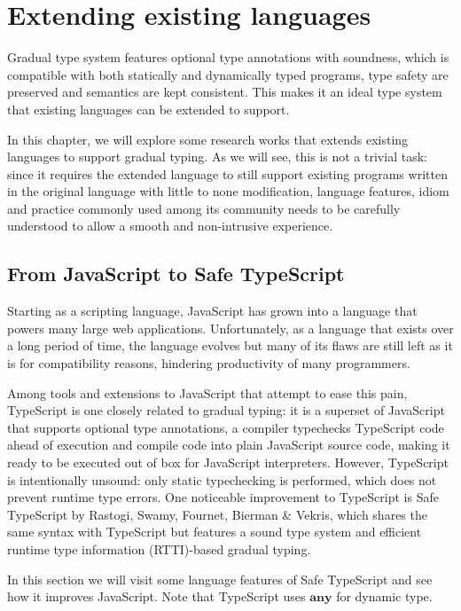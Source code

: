 
\renewcommand{\thechapter}{2}

\chapter{Extending existing languages}

Gradual type system features optional type annotations with soundness,
which is compatible with both statically and dynamically typed programs,
type safety are preserved and semantics are kept consistent.
This makes it an ideal type system that
existing languages can be extended to support.

In this chapter, we will explore some research works that extends existing languages
to support gradual typing. As we will see, this is not a trivial task:
since it requires the extended language to still support existing programs written
in the original language with little to none modification,
language features, idiom and practice commonly used among its community
needs to be carefully understood to allow a smooth and non-intrusive experience.

\section{From JavaScript to Safe TypeScript}

Starting as a scripting language, JavaScript has grown into a language
that powers many large web applications.
Unfortunately, as a language that exists over a long period of time,
the language evolves but many of its flaws are still left as it is for compatibility reasons,
hindering productivity of many programmers.

Among tools and extensions to JavaScript that attempt to ease this pain,
TypeScript is one closely related to gradual typing:
it is a superset of JavaScript that supports optional type annotations,
a compiler typechecks TypeScript code ahead of execution and compile code
into plain JavaScript source code, making it ready to be executed out of box
for JavaScript interpreters.
However, TypeScript is intentionally unsound: only static typechecking is performed,
which does not prevent runtime type errors.
One noticeable improvement to TypeScript is Safe TypeScript by Rastogi, Swamy, Fournet, Bierman \& Vekris, which shares the same syntax with TypeScript
but features a sound type system and efficient runtime type information (RTTI)-based
gradual typing.

In this section we will visit some language features of Safe TypeScript and see how it improves JavaScript. Note that TypeScript uses $\textbf{any}$ for dynamic type.

